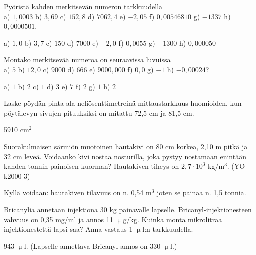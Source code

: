 \begin{tehtavasivu}
\begin{tehtava}
Pyöristä kahden merkitsevän numeron tarkkuudella \\
a) $1,0003$ \qquad
b) $3,69$ \qquad
c) $152,8$ \qquad
d) $7062,4$ \qquad
e) $-2,05$ \qquad
f) $0,00546810$ \qquad
g) $-1337$ \qquad
h) $0,0000501$.
\begin{vastaus}
a) $1,0$ \qquad
b) $3,7$ \qquad
c) $150$ \qquad
d) $7000$ \qquad
e) $-2,0$ \qquad
f) $0,0055$ \qquad
g) $-1300$ \qquad
h) $0,000050$
\end{vastaus}
\end{tehtava}

\begin{tehtava}
Montako merkitsevää numeroa on seuraavissa luvuissa \\
a) $5$ \qquad
b) $12,0$ \qquad
c) $9000$ \qquad
d) $666$ \qquad
e) $9000,000$ \qquad
f) $0,0$ \qquad
g) $-1$ \qquad
h) $-0,00024$?
\begin{vastaus}
a) $1$ \qquad
b) $2$ \qquad
c) $1$ \qquad
d) $3$ \qquad
e) $7$ \qquad
f) $2$ \qquad
g) $1$ \qquad
h) $2$
\end{vastaus}
\end{tehtava}

\begin{tehtava}
Laske pöydän pinta-ala neliösenttimetreinä mittaustarkkuus huomioiden,
kun pöytälevyn sivujen pituuksiksi on mitattu 72,5 cm ja 81,5 cm.
\begin{vastaus}
5910 cm$^2$
\end{vastaus}
\end{tehtava}

\begin{tehtava}
Suorakulmaisen särmiön muotoinen hautakivi on 80 cm korkea, 2,10 m pitkä ja 32 cm leveä.
Voidaanko kivi nostaa nosturilla, joka pystyy nostamaan enintään kahden tonnin painoisen kuorman?
Hautakiven tiheys on $2,7 \cdot 10^3$ kg/m$^3$. (YO k2000 3)
\begin{vastaus}
Kyllä voidaan: hautakiven tilavuus on n. 0,54 m$^3$ joten se painaa n. 1,5 tonnia.
\end{vastaus}
\end{tehtava}

\begin{tehtava}
 Bricanylia annetaan injektiona 30 kg painavalle lapselle. Bricanyl-injektionesteen vahvuus on 
 0,35 mg/ml ja annos 11 $\upmu$g/kg. Kuinka monta mikrolitraa injektionestettä lapsi saa? Anna 
 vastaus 1 $\upmu$l:n tarkkuudella.
 \begin{vastaus}
  943 $\upmu$l. (Lapselle annettava Bricanyl-annos on 330 $\upmu$l.)
 \end{vastaus}
\end{tehtava}


\end{tehtavasivu}
